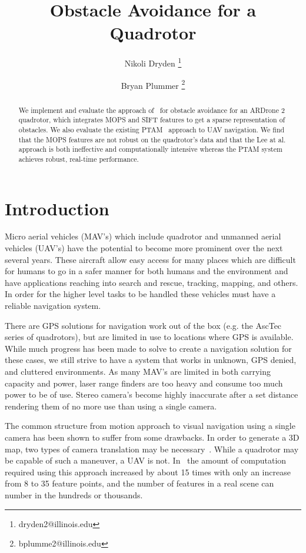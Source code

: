 \documentclass{acmsiggraph}
\title{Obstacle Avoidance for a Quadrotor}
\author{Nikoli Dryden \thanks{dryden2@illinois.edu} %
\and Bryan Plummer \thanks{bplumme2@illinois.edu}}
\begin{document}
\maketitle

\begin{abstract}
We implement and evaluate the approach of~\cite{lee2011} for obstacle avoidance for an ARDrone 2 quadrotor, which integrates MOPS and SIFT features to get a sparse representation of obstacles. We also evaluate the existing PTAM~\cite{klein07parallel} approach to UAV navigation. We find that the MOPS features are not robust on the quadrotor's data and that the Lee at al. approach is both ineffective and computationally intensive whereas the PTAM system achieves robust, real-time performance.
\end{abstract}

\section{Introduction}
Micro aerial vehicles (MAV's) which include quadrotor and unmanned aerial vehicles (UAV's) have the potential to become more 
prominent over the next several years.  These aircraft allow easy access for many places which are difficult for humans 
to go in a safer manner for both humans and the environment and have applications reaching into search and rescue, tracking,
mapping, and others.  In order for the higher level tasks to be handled these vehicles must have a reliable 
navigation system.

There are GPS solutions for navigation work out of the box (e.g. the AscTec series of quadrotors), but are limited in use
to locations where GPS is available.  While much progress has been made to solve to create a navigation solution
for these cases, we still strive to have a system that works in unknown, GPS denied, and cluttered environments.  As many 
MAV's are limited in both carrying capacity and power, laser range finders are too heavy and consume too much power to be of 
use. Stereo camera's become highly inaccurate after a set distance rendering them of no more use than using a single camera.

The common structure from motion approach to visual navigation using a single camera has been shown to suffer from some 
drawbacks.  In order to generate a 3D map, two types of camera translation may be necessary~\cite{shah2010}.  While
a quadrotor may be capable of such a maneuver, a UAV is not.  In~\cite{shah2009} the amount of computation required using this 
approach increased by about 15 times with only an increase from 8 to 35 feature points, and the number of features in a real
scene can number in the hundreds or thousands.
\end{document}
